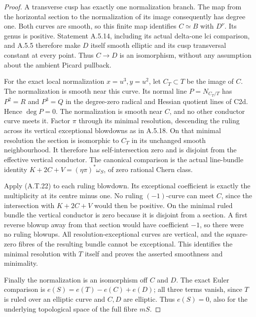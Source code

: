 \begin{proof}
A transverse cusp has exactly one normalization
branch. The map from the horizontal section to the
normalization of its image consequently has degree
one. Both curves are smooth, so this finite map
identifies $C\simeq B$ with $D^\nu$. Its genus is
positive. Statement A.5.14, including its actual
delta-one lci comparison, and A.5.5 therefore make
$D$ itself smooth elliptic and its cusp transversal
constant at every point. Thus $C\to D$ is an
isomorphism, without any assumption about the
ambient Picard pullback.

For the exact local normalization $x=u^3,y=u^2$,
let $C_T\subset T$ be the image of $C$. The
normalization is smooth near this curve. Its normal
line $P=N_{C_T/T}$ has $P^2=R$ and $P^3=Q$
in the degree-zero radical and Hessian quotient
lines of C2d. Hence $\deg P=0$. The normalization
is smooth near $C$, and no other conductor curve
meets it. Factor $\pi$ through its minimal
resolution, descending the ruling across its
vertical exceptional blowdowns as in A.5.18.
On that minimal resolution the section is isomorphic
to $C_T$ in its unchanged smooth neighbourhood. It
therefore has self-intersection zero and is disjoint from
the effective vertical conductor. The canonical
comparison is the actual line-bundle identity
$K+2C+V=(\eta\pi)^*\omega_S$, of zero rational
Chern class.

Apply (A.T.22) to each ruling blowdown. Its
exceptional coefficient is exactly the multiplicity
at its centre minus one. No ruling $(-1)$-curve
can meet $C$, since the intersection with $K+2C+V$
would then be positive. On the minimal ruled
bundle the vertical conductor is zero because it
is disjoint from a section. A first reverse blowup
away from that section would have coefficient
$-1$, so there were no ruling blowups. All
resolution-exceptional curves are vertical, and
the square-zero fibres of the resulting bundle
cannot be exceptional. This identifies the minimal
resolution with $T$ itself and proves the asserted
smoothness and minimality.

Finally the normalization is an isomorphism off
$C$ and $D$. The exact Euler comparison is
$e(S)=e(T)-e(C)+e(D)$; all three terms vanish,
since $T$ is ruled over an elliptic curve and
$C,D$ are elliptic. Thus $e(S)=0$, also for the
underlying topological space of the full fibre $mS$.
\end{proof}
